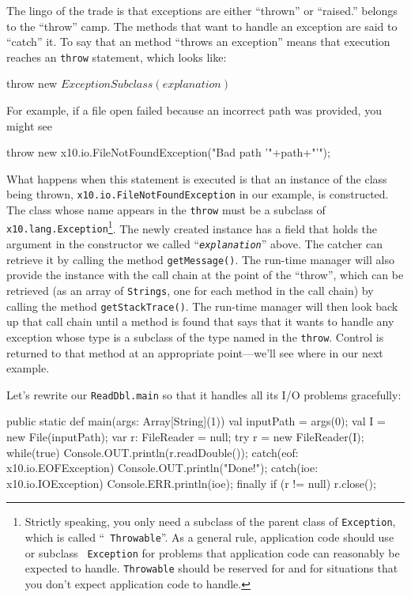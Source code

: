 The lingo of the trade is that exceptions are either ``thrown'' or ``raised.'' 
\Xten{} belongs to the ``throw'' camp.  The methods that want to handle an
exception are said to ``catch'' it.
To say that an \Xten{} method ``throws an exception'' means that execution
reaches an \Xten{} {\tt throw} statement, which looks like:
\begin{xtenmath}
throw new $ExceptionSubclass(explanation)$
\end{xtenmath}
For example, if a file open failed because an incorrect path was provided, you
might see
\begin{xten}
throw new x10.io.FileNotFoundException("Bad path '"+path+"'");
\end{xten}
What happens when this statement is executed is that an instance of the
class being thrown, {\tt x10.io.FileNotFoundException} in our example,
is constructed.  The class whose name appears in the {\tt throw} must be a
subclass of {\tt x10.lang.Exception}\footnote{Strictly speaking,  you only need
a subclass of the parent class of {\tt Exception}, which is called ``{\tt
Throwable}''.  As a general rule, application code should use or subclass {\tt
Exception} for problems that application code can reasonably be expected to
handle.  {\tt Throwable} should be reserved for \Xten{} and for situations that
you don't expect application code to handle.}.
The newly created instance has a field that holds the argument in the
constructor we called ``{\tt{\em explanation}}'' above.
The catcher can retrieve it by calling the
method {\tt getMessage()}.  The \Xten{} run-time manager will also provide the
instance with the call chain at the point of the ``throw'', which can be
retrieved (as an array of {\tt Strings}, one for each method in the call chain)
by calling the method {\tt getStackTrace()}.  The \Xten{} run-time manager will
then look back up that call chain until a method is found that says that it
wants to handle any exception whose type is a
subclass of the type named in the {\tt throw}.  Control is returned to that
method at an appropriate point---we'll see where in our next example.

Let's rewrite our {\tt ReadDbl.main} so that it handles all its I/O
problems gracefully: 
\begin{xtennum}[]
public static def main(args: Array[String](1)) {
   val inputPath  = args(0);
   val I  = new File(inputPath);
   var r: FileReader = null; 
   try {
      r = new FileReader(I);
      while(true) { 
         Console.OUT.println(r.readDouble());
      }
   } catch(eof: x10.io.EOFException) { 
         Console.OUT.println("Done!"); 
   } catch(ioe: x10.io.IOException) {
     Console.ERR.println(ioe);
   } finally {
     if (r != null) r.close(); 
  }
} 
\end{xtennum}



